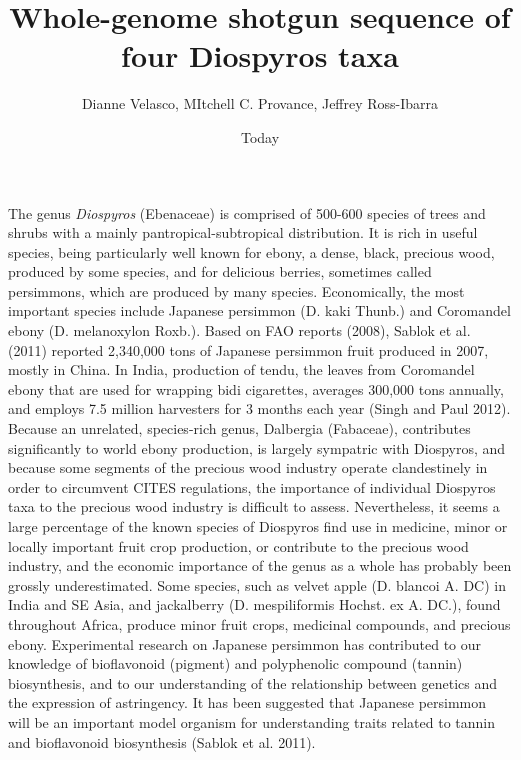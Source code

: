 \documentclass[]{article}
\begin{document}
\title{Whole-genome shotgun sequence of four Diospyros taxa}
\author{Dianne Velasco, MItchell C. Provance, Jeffrey Ross-Ibarra}
\date{Today}
\maketitle

The genus \emph{Diospyros} (Ebenaceae) is comprised of 500-600 species of trees and shrubs with a mainly pantropical-subtropical distribution. It is rich in useful species, being particularly well known for ebony, a dense, black, precious wood, produced by some species, and for delicious berries, sometimes called persimmons, which are produced by many species. Economically, the most important species include Japanese persimmon (D. kaki Thunb.) and Coromandel ebony (D. melanoxylon Roxb.). Based on FAO reports (2008), Sablok et al. (2011) reported 2,340,000 tons of Japanese persimmon fruit produced in 2007, mostly in China. In India, production of tendu, the leaves from Coromandel ebony that are used for wrapping bidi cigarettes, averages 300,000 tons annually, and employs 7.5 million harvesters for 3 months each year (Singh and Paul 2012). Because an unrelated, species-rich genus, Dalbergia (Fabaceae), contributes significantly to world ebony production, is largely sympatric with Diospyros, and because some segments of the precious wood industry operate clandestinely in order to circumvent CITES regulations, the importance of individual Diospyros taxa to the precious wood industry is difficult to assess. Nevertheless, it seems a large percentage of the known species of Diospyros find use in medicine, minor or locally important fruit crop production, or contribute to the precious wood industry, and the economic importance of the genus as a whole has probably been grossly underestimated. Some species, such as velvet apple (D. blancoi A. DC) in India and SE Asia, and jackalberry (D. mespiliformis Hochst. ex A. DC.), found throughout Africa, produce minor fruit crops, medicinal compounds, and precious ebony. Experimental research on Japanese persimmon has contributed to our knowledge of bioflavonoid (pigment) and polyphenolic compound (tannin) biosynthesis, and to our understanding of the relationship between genetics and the expression of astringency. It has been suggested that Japanese persimmon will be an important model organism for understanding traits related to tannin and bioflavonoid biosynthesis (Sablok et al. 2011).
 
\end{document}
